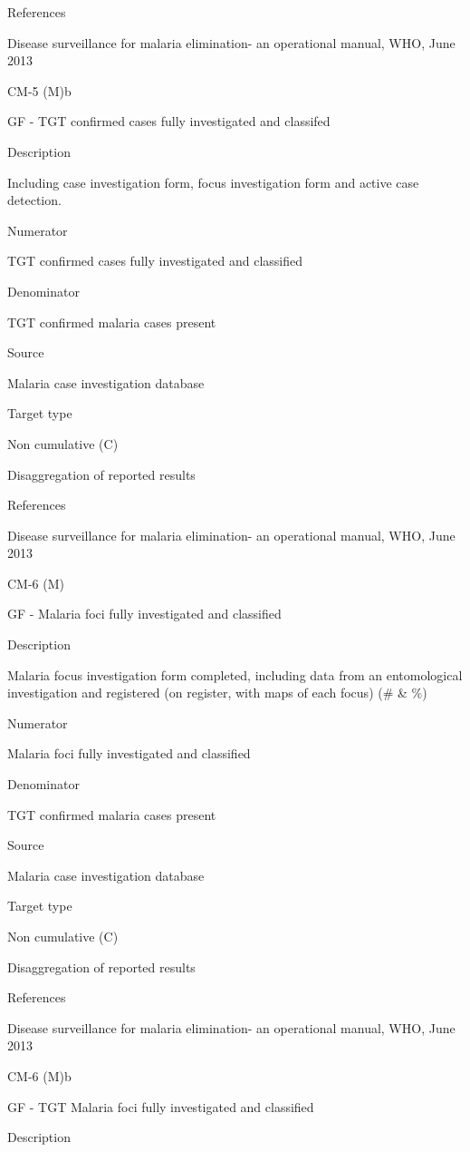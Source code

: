 \documentclass[]{book}
\begin{document}
References

Disease surveillance for malaria elimination- an operational manual, WHO, June 2013

CM-5 (M)b

GF - TGT confirmed cases fully investigated and classifed

Description

Including case investigation form, focus investigation form and active case detection.

Numerator

TGT confirmed cases fully investigated and classified

Denominator

TGT confirmed malaria cases present

Source

Malaria case investigation database

Target type

Non cumulative (C)

Disaggregation of reported results

References

Disease surveillance for malaria elimination- an operational manual, WHO, June 2013

CM-6 (M)

GF - Malaria foci fully investigated and classified

Description

Malaria focus investigation form completed, including data from an entomological investigation and registered (on register, with maps of each focus) (\# \& \%)

Numerator

Malaria foci fully investigated and classified

Denominator

TGT confirmed malaria cases present

Source

Malaria case investigation database

Target type

Non cumulative (C)

Disaggregation of reported results

References

Disease surveillance for malaria elimination- an operational manual, WHO, June 2013

CM-6 (M)b

GF - TGT Malaria foci fully investigated and classified

Description
\end{document}
